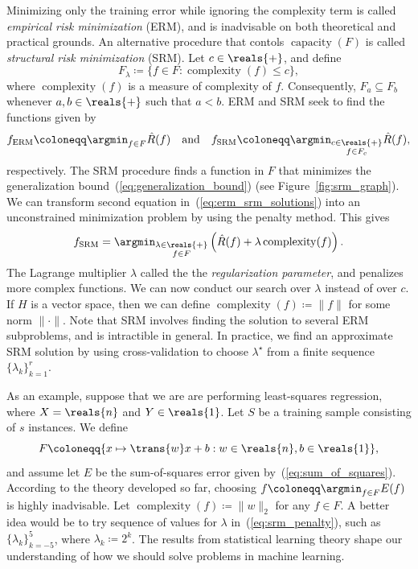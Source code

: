 \documentclass[11pt,a4paper]{article}
\numberwithin{equation}{section}
\newcommand{\capacity}{\operatorname{capacity}}
\newcommand{\complexity}{\operatorname{complexity}}
\begin{document}
Minimizing only the training error while ignoring the complexity term is called
\emph{empirical risk minimization} (ERM), and is inadvisable on both theoretical
and practical grounds. An alternative procedure that contols $\capacity(F)$ is
called \emph{structural risk minimization} (SRM). Let $c \in \reals{+}$, and
define
\begin{equation}
	F_\lambda \coloneqq \{ f \in F : \complexity(f) \leq c \},
	\label{eq:regularized_family}
\end{equation}
where $\complexity(f)$ is a measure of complexity of $f$. Consequently, $F_a
\subseteq F_b$ whenever $a, b \in \reals{+}$ such that $a < b$. ERM and SRM seek
to find the functions given by
\begin{equation}
	f_{\text{ERM}} \coloneqq \argmin_{f \in F} \hat{R}(f)
	\quad\text{and}\quad
	f_{\text{SRM}} \coloneqq \argmin_{\substack{c \in \reals{+} \\ f \in F_c}}
		\hat{R}(f),
	\label{eq:erm_srm_solutions}
\end{equation}
respectively. The SRM procedure finds a function in $F$ that minimizes the
generalization bound~(\ref{eq:generalization_bound}) (see
Figure~\ref{fig:srm_graph}). We can transform second equation
in~(\ref{eq:erm_srm_solutions}) into an unconstrained minimization problem by
using the penalty method. This gives
\begin{equation}
	f_{\text{SRM}} = \argmin_{\substack{\lambda \in \reals{+} \\ f \in F}}
		\left(\hat{R}(f) + \lambda\complexity(f)\right).
	\label{eq:srm_penalty}
\end{equation}
The Lagrange multiplier $\lambda$ called the the \emph{regularization
parameter}, and penalizes more complex functions. We can now conduct our search
over $\lambda$ instead of over $c$. If $H$ is a vector space, then we can define
$\complexity(f) \coloneqq \|f\|$ for some norm ${\|\cdot\|}$. Note that SRM
involves finding the solution to several ERM subproblems, and is intractible in
general. In practice, we find an approximate SRM solution by using
cross-validation to choose $\lambda^\star$ from a finite sequence $\{ \lambda_k
\}_{k = 1}^r$.

As an example, suppose that we are are performing least-squares regression,
where $X = \reals{n}$ and $Y \in \reals{1}$. Let $S$ be a training sample
consisting of $s$ instances. We define
\[
	F \coloneqq \{ x \mapsto \trans{w}x + b : w \in \reals{n}, b \in
		\reals{1} \},
	\label{eq:affine_family}
\]
and assume let $E$ be the sum-of-squares error given
by~(\ref{eq:sum_of_squares}). According to the theory developed so far, choosing
$f \coloneqq \argmin_{f \in F} E(f)$ is highly inadvisable. Let $\complexity(f)
\coloneqq \|w\|_2$ for any $f \in F$. A better idea would be to try sequence of
values for $\lambda$ in~(\ref{eq:srm_penalty}), such as $\{ \lambda_k \}_{k =
-5}^5$, where $\lambda_k \coloneqq 2^k$. The results from statistical learning
theory shape our understanding of how we should solve problems in machine
learning.
\end{document}
